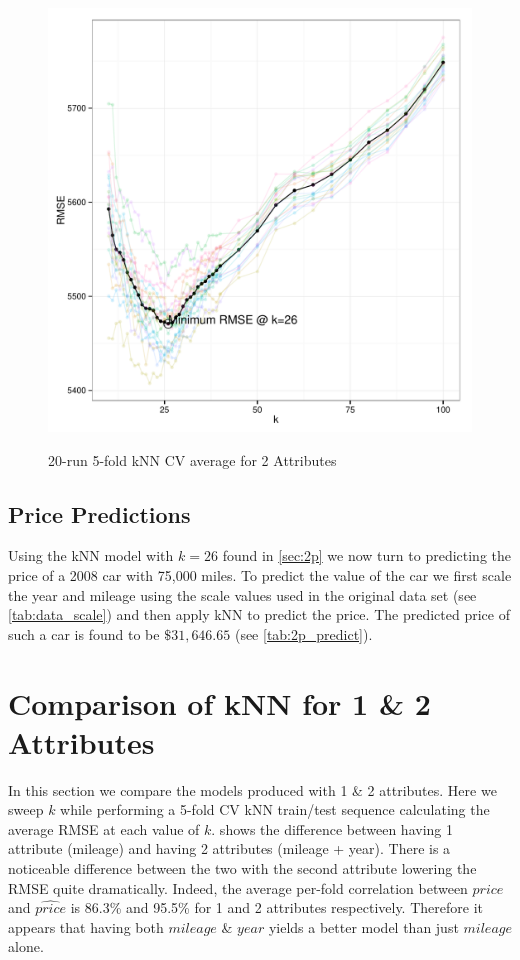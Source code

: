 \documentclass[11pt, fleqn]{article}
\begin{document}
\begin{figure}[!htb]
  \centering
  \caption{20-run 5-fold kNN CV average for 2 Attributes}
  \includegraphics[scale=.5]{2p_cv_multi_k.pdf}
  \label{fig:2p_k_multi}
\end{figure}

\subsection{Price Predictions}
Using the kNN model with $k=26$ found in \cref{sec:2p} we now turn to predicting the price of a 2008 car with 75,000 miles.  To predict the value of the car we first scale the year and mileage using the scale values used in the original data set (see \cref{tab:data_scale}) and then apply kNN to predict the price.  The predicted price of such a car is found to be $\$31,646.65$ (see \cref{tab:2p_predict}).



\section{Comparison of kNN for 1 \& 2 Attributes}
In this section we compare the models produced with 1 \& 2 attributes.  Here we sweep $k$ while performing a 5-fold CV kNN train/test sequence calculating the average RMSE at each value of $k$.   shows the difference between having 1 attribute (mileage) and having 2 attributes (mileage + year).  There is a noticeable difference between the two with the second attribute lowering the RMSE quite dramatically.  Indeed, the average per-fold correlation between $price$ and $\widehat{price}$ is 86.3\% and 95.5\% for 1 and 2 attributes respectively.  Therefore it appears that having both $mileage$ \& $year$ yields a better model than just $mileage$ alone.
\end{document}
